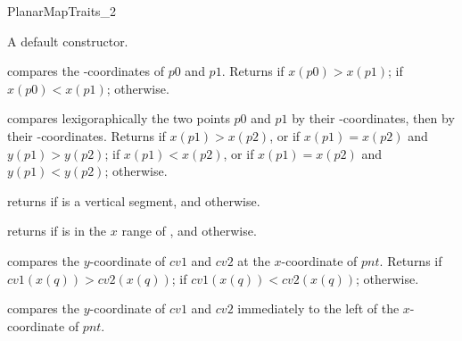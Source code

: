 \begin{ccRefConcept}{PlanarMapTraits_2}
\ccCreation
    

    {A default constructor.}

    \ccOperations

    {compares the -coordinates of $p0$ and $p1$.  Returns
     if $x(p0) > x(p1)$;  if $x(p0) < x(p1)$;
     otherwise.}
    
    {compares lexigoraphically the two points $p0$ and $p1$ by their
    -coordinates, then by their -coordinates.
    Returns  if $x(p1) > x(p2)$, or if
                        $x(p1) = x(p2)$ and $y(p1) > y(p2)$; 
     if $x(p1) < x(p2)$, or if $x(p1) = x(p2)$ and
                      $y(p1) < y(p2)$;
     otherwise.}

   {returns  if  is a vertical segment, and
     otherwise.}
        
    {returns  if  is in the $x$ range of
    , and  otherwise.}
    
    {compares the $y$-coordinate of $cv1$ and $cv2$ at the $x$-coordinate 
    of $pnt$. Returns  if $cv1(x(q)) > cv2(x(q))$;
     if $cv1(x(q)) < cv2(x(q))$;  otherwise.
    }

    {compares the $y$-coordinate of $cv1$ and $cv2$ immediately to the
     left of the $x$-coordinate of $pnt$. 
    }
    

\end{ccRefConcept}
